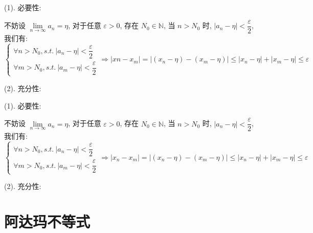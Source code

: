 \begin{anymark}[证明]
	(1). 必要性:

	不妨设 $\lim\limits_{n\to \infty} a_{n} =\eta$, 对于任意 $\varepsilon > 0$, 存在 $N_{0}\in\mathbb{N}$, 当 $n>N_{0}$ 时, $|a_{n}-\eta|<\dfrac{\varepsilon}{2}$, 我们有:
	$$\begin{cases} 
		\forall n > N_{0}, s.t.\ |a_{n} - \eta| < \dfrac{\varepsilon}{2}\\ 
		\forall m > N_{0}, s.t.\ |a_{m} - \eta| < \dfrac{\varepsilon}{2}
	\end{cases}
	\Rightarrow 
	|x{n}-x_{m}| = |(x_{n} - \eta) - (x_{m} - \eta)| \leq |x_{n} - \eta| + |x_{m}-\eta| \leq \varepsilon$$

	(2). 充分性:


\end{anymark}

\begin{proposition}
	
\end{proposition}

\begin{anymark}[证明]
	(1). 必要性:

	不妨设 $\lim\limits_{n\to \infty} a_{n} =\eta$, 对于任意 $\varepsilon > 0$, 存在 $N_{0}\in\mathbb{N}$, 当 $n>N_{0}$ 时, $|a_{n}-\eta|<\dfrac{\varepsilon}{2}$, 我们有:
	$$\begin{cases} 
		\forall n > N_{0}, s.t.\ |a_{n} - \eta| < \dfrac{\varepsilon}{2}\\ 
		\forall m > N_{0}, s.t.\ |a_{m} - \eta| < \dfrac{\varepsilon}{2}
	\end{cases}
	\Rightarrow 
	|x_{n}-x_{m}| = |(x_{n} - \eta) - (x_{m} - \eta)| \leq |x_{n} - \eta| + |x_{m}-\eta| \leq \varepsilon$$

	(2). 充分性:


\end{anymark}

\begin{proposition}[柯西收敛准则:函数]
	
\end{proposition}
\section{阿达玛不等式}

